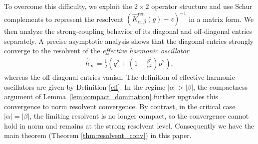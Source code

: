 \documentclass[12pt,dvipdfmx]{article}
\begin{document}
To overcome this difficulty, we exploit the $2\times2$ operator structure and use Schur complements to represent the resolvent $(\hat{K}_{\alpha,\beta}^{\mathrm{ren} }(g)-z)^{-1}$ in a matrix form. We then analyze the strong-coupling behavior of its diagonal and off-diagonal entries separately. A precise asymptotic analysis shows that the diagonal entries strongly converge  to the resolvent of the {\it effective harmonic oscillator}:
\begin{align}
\label{effho}
\hat h_\infty=    \frac12
    \left(
        q^2 + \left(1 - \frac{\beta^2}{\alpha^2}\right) p^2
    \right),
\end{align}
whereas the off-diagonal entries vanish. The definition of effective harmonic oscillators are given by Definition \ref{eff}. 
In the regime $|\alpha|>|\beta|$, the compactness argument of Lemma~\ref{lem:compact_domination} further upgrades this convergence to norm resolvent convergence. By contrast, in the critical case $|\alpha|=|\beta|$, the limiting resolvent is no longer compact, so the convergence cannot hold in norm and remains at the strong resolvent level. 
Consequently we have the main theorem (Theorem \ref{thm:resolvent_conv}) in this paper. 
\end{document}
